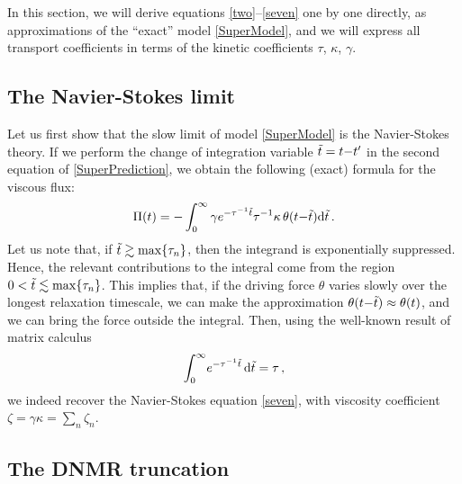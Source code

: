 \documentclass[a4paper, amsfonts, amssymb, amsmath, reprint, showkeys, nofootinbib, twoside, onecolumn,notitlepage]{revtex4-2}
\renewcommand{\d}{\mathrm{d}}
\begin{document}
In this section, we will derive equations \eqref{two}--\eqref{seven} one by one directly, as approximations of the ``exact'' model \eqref{SuperModel}, and we will express all transport coefficients in terms of the kinetic coefficients $\tau$, $\kappa$, $\gamma$.


\subsection{The Navier-Stokes limit}

Let us first show that the slow limit of model \eqref{SuperModel} is the Navier-Stokes theory. If we perform the change of integration variable $\Tilde{t}=t{-}t'$ in the second equation of \eqref{SuperPrediction}, we obtain the following (exact) formula for the viscous flux:
\begin{equation}
    \Pi(t) = -\int_0^{\infty} \gamma e^{-\tau^{-1} \Tilde{t}}\tau^{-1} \kappa \, \theta(t{-}\Tilde{t}) \d\Tilde{t} \, .
\end{equation}
Let us note that, if $\Tilde{t}\gtrsim \max\{\tau_n\}$, then the integrand is exponentially suppressed. Hence, the relevant contributions to the integral come from the region $0<\Tilde{t} \lesssim \max\{\tau_n\}$. This implies that, if the driving force $\theta$ varies slowly over the longest relaxation timescale, we can make the approximation $\theta(t{-}\Tilde{t})\approx \theta(t)$, and we can bring the force outside the integral. Then, using the well-known result of matrix calculus
\begin{equation}
    \int_0^{\infty} \! e^{-\tau^{-1} \Tilde{t}}\, \d\Tilde{t} = \tau \, ,
\end{equation}
we indeed recover the Navier-Stokes equation \eqref{seven}, with viscosity coefficient $\zeta=\gamma \kappa=\sum_n \zeta_n$.


\subsection{The DNMR truncation}
\end{document}
